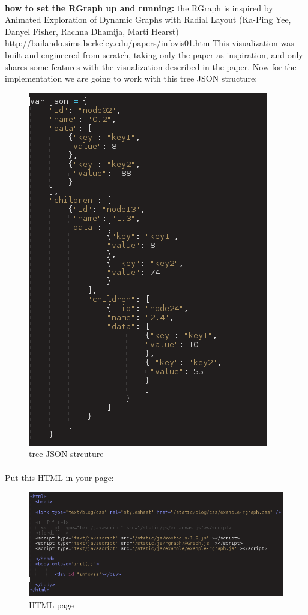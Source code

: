 \paragraph*{}
\textbf{how to set the RGraph up and running:} the RGraph is inspired by Animated Exploration of Dynamic Graphs with Radial Layout (Ka-Ping Yee, Danyel Fisher, Rachna Dhamija, Marti Hearst) \url{http://bailando.sims.berkeley.edu/papers/infovis01.htm}
This visualization was built and engineered from scratch, taking only the paper as inspiration, and only shares some features with the visualization described in the paper.
Now for the implementation we are going to work with this tree JSON structure: 
\newpage
\begin{figure}[h]
\centering
\includegraphics[scale=0.5]{example2.png}
\caption{tree JSON strcuture}
\end{figure}

\paragraph*{}
Put this HTML in your page: 

\begin{figure}[h]
\centering
\includegraphics[scale=0.5]{htmlpage.png}
\caption{HTML page}
\end{figure}
\newpage
